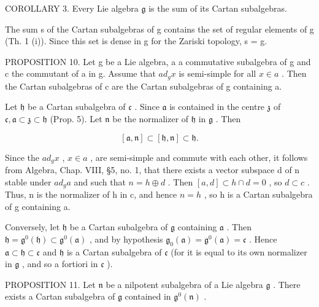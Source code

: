 COROLLARY 3. Every Lie algebra \(\mathfrak{g}\) is the sum of its Cartan subalgebras.

The sum s of the Cartan subalgebras of g contains the set of regular elements of g (Th. 1 (i)). Since this set is dense in g for the Zariski topology, s = g.

PROPOSITION 10. Let g be a Lie algebra, a a commutative subalgebra of g and c the commutant of a in g. Assume that \(ad_{g}x\) is semi-simple for all \(x \in a\) . Then the Cartan subalgebras of c are the Cartan subalgebras of g containing a.

Let \(\mathfrak{h}\) be a Cartan subalgebra of \(\mathfrak{c}\) . Since \(\mathfrak{a}\) is contained in the centre \(\mathfrak{z}\) of \(\mathfrak{c}, \mathfrak{a} \subset \mathfrak{z} \subset \mathfrak{h}\) (Prop. 5). Let \(\mathfrak{n}\) be the normalizer of \(\mathfrak{h}\) in \(\mathfrak{g}\) . Then

\[
[ \mathfrak {a}, \mathfrak {n} ] \subset [ \mathfrak {h}, \mathfrak {n} ] \subset \mathfrak {h}.
\]

Since the \(ad_{g}x\) , \(x \in a\) , are semi-simple and commute with each other, it follows from Algebra, Chap. VIII, §5, no. 1, that there exists a vector subspace d of n stable under \(ad_{g}a\) and such that \(n = h \oplus d\) . Then \([a, d] \subset h \cap d = 0\) , so \(d \subset c\) . Thus, n is the normalizer of h in c, and hence \(n = h\) , so h is a Cartan subalgebra of g containing a.

Conversely, let \(\mathfrak{h}\) be a Cartan subalgebra of \(\mathfrak{g}\) containing \(\mathfrak{a}\) . Then \(\mathfrak{h} = \mathfrak{g}^0 (\mathfrak{h})\subset \mathfrak{g}^0 (\mathfrak{a})\) , and by hypothesis \(\mathfrak{g}_0(\mathfrak{a}) = \mathfrak{g}^0 (\mathfrak{a}) = \mathfrak{c}\) . Hence \(\mathfrak{a}\subset \mathfrak{h}\subset \mathfrak{c}\) and \(\mathfrak{h}\) is a Cartan subalgebra of \(\mathfrak{c}\) (for it is equal to its own normalizer in \(\mathfrak{g}\) , and so a fortiori in \(\mathfrak{c}\) ).

PROPOSITION 11. Let \(\mathfrak{n}\) be a nilpotent subalgebra of a Lie algebra \(\mathfrak{g}\) . There exists a Cartan subalgebra of \(\mathfrak{g}\) contained in \(\mathfrak{g}^0 (\mathfrak{n})\) .

